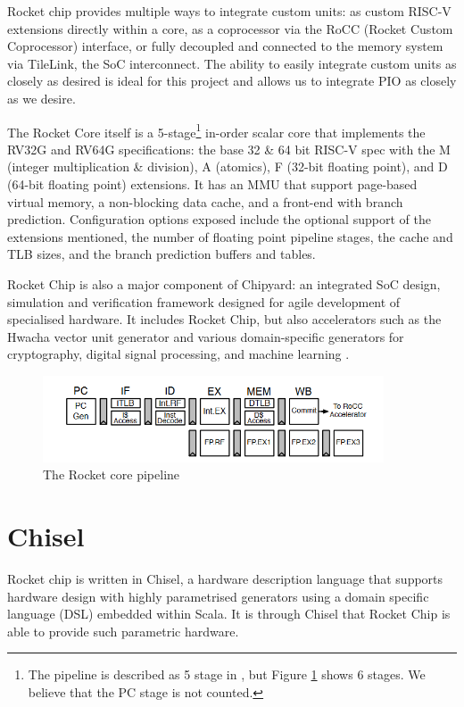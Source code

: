Rocket chip provides multiple ways to integrate custom units: as custom RISC-V extensions directly within a core, as a coprocessor via the RoCC (Rocket Custom Coprocessor) interface, or fully decoupled and connected to the memory system via TileLink, the SoC interconnect. The ability to easily integrate custom units as closely as desired is ideal for this project and allows us to integrate PIO as closely as we desire.

The Rocket Core itself is a 5-stage\footnote{The pipeline is described as 5 stage in \cite{rocketchip}, but Figure \ref{fig:rocket-core} shows 6 stages. We believe that the PC stage is not counted.} in-order scalar core that implements the RV32G and RV64G specifications: the base 32 \& 64 bit RISC-V spec with the M (integer multiplication \& division), A (atomics), F (32-bit floating point), and D (64-bit floating point) extensions. It has an MMU that support page-based virtual memory, a non-blocking data cache, and a front-end with branch prediction. Configuration options exposed include the optional support of the extensions mentioned, the number of floating point pipeline stages, the cache and TLB sizes, and the branch prediction buffers and tables.

Rocket Chip is also a major component of Chipyard: an integrated SoC design, simulation and verification framework designed for agile development of specialised hardware. It includes Rocket Chip, but also accelerators such as the Hwacha vector unit generator and various domain-specific generators for cryptography, digital signal processing, and machine learning \cite{chipyard}.

\begin{figure}[h!]
    \centering
    \includegraphics[width=0.9\textwidth]{../img/rocket-core.png}
    \caption{The Rocket core pipeline \cite{rocketchip} }
    \label{fig:rocket-core}
\end{figure}

\section{Chisel}
Rocket chip is written in Chisel, a hardware description language that supports hardware design with highly parametrised generators using a domain specific language (DSL) embedded within Scala. It is through Chisel that Rocket Chip is able to provide such parametric hardware.


